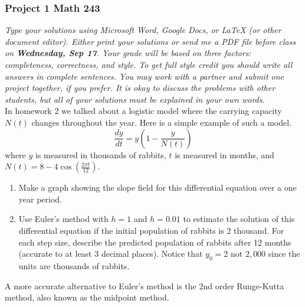 \documentclass[10pt]{article}
\begin{document}
\subsubsection*{Project 1 \hfill Math 243}

\textit{Type your solutions using Microsoft Word, Google Docs, or LaTeX (or other document editor). Either print your solutions or send me a PDF file before class on \textbf{Wednesday, Sep 17}. Your grade will be based on three factors: completeness, correctness, and style. To get full style credit you should write all answers in complete sentences. You may work with a partner and submit one project together, if you prefer. It is okay to discuss the problems with other students, but all of your solutions must be explained in your own words. }  \\

In homework 2 we talked about a logistic model where the carrying capacity $N(t)$ changes throughout the year.  Here is a simple example of such a model. 
$$\dfrac{dy}{dt} = y \left( 1 - \dfrac{y}{N(t)} \right)$$
where $y$ is measured in thousands of rabbits, $t$ is measured in months, and $N(t) = 8 - 4 \cos(\tfrac{2\pi t}{12} )$.  


\begin{enumerate}
\item Make a graph showing the slope field for this differential equation over a one year period.

\item Use Euler's method with $h = 1$ and $h=0.01$ to estimate the solution of this differential equation if the initial population of rabbits is 2 thousand. For each step size, describe the predicted population of rabbits after 12 months (accurate to at least 3 decimal places). Notice that $y_0 = 2$ not $2{,}000$ since the units are thousands of rabbits. 
\end{enumerate}

\noindent
A more accurate alternative to Euler's method is the 2nd order Runge-Kutta method, also known as the midpoint method.  
\bigskip

\noindent{}
\bigskip
\end{document}
